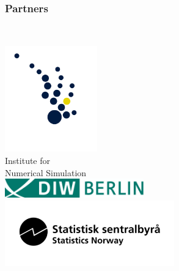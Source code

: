 \begin{frame}\frametitle{Partners}\vspace{1.0cm}

\begin{columns}[t]

\centering \\  \vspace{-1.25cm}
	\includegraphics[width=0.3\textwidth]{material/crop-cooperation-ins.png} \\\vspace{-0.5cm}
		\footnotesize{Institute for \\ Numerical Simulation}\vspace{0.3cm}   \\ \vspace{0.5cm}
	\includegraphics[width=0.45\textwidth]{material/crop-cooperation-diw.png} \\ \vspace{0.5cm}
	\includegraphics[width=0.55\textwidth]{material/crop-cooperation-ssb.png} \\


\end{columns}
\end{frame}

